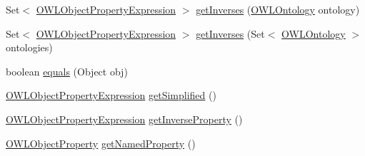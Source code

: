 \begin{DoxyCompactItemize}
Set$<$ \hyperlink{interfaceorg_1_1semanticweb_1_1owlapi_1_1model_1_1_o_w_l_object_property_expression}{O\-W\-L\-Object\-Property\-Expression} $>$ \hyperlink{classuk_1_1ac_1_1manchester_1_1cs_1_1owl_1_1owlapi_1_1_o_w_l_object_property_expression_impl_a078914721249eddee5fa7cf87da4c7b8}{get\-Inverses} (\hyperlink{interfaceorg_1_1semanticweb_1_1owlapi_1_1model_1_1_o_w_l_ontology}{O\-W\-L\-Ontology} ontology)
\item 
Set$<$ \hyperlink{interfaceorg_1_1semanticweb_1_1owlapi_1_1model_1_1_o_w_l_object_property_expression}{O\-W\-L\-Object\-Property\-Expression} $>$ \hyperlink{classuk_1_1ac_1_1manchester_1_1cs_1_1owl_1_1owlapi_1_1_o_w_l_object_property_expression_impl_a774d4ed2acd7eb6e2bfbf3a61ba978f7}{get\-Inverses} (Set$<$ \hyperlink{interfaceorg_1_1semanticweb_1_1owlapi_1_1model_1_1_o_w_l_ontology}{O\-W\-L\-Ontology} $>$ ontologies)
\item 
boolean \hyperlink{classuk_1_1ac_1_1manchester_1_1cs_1_1owl_1_1owlapi_1_1_o_w_l_object_property_expression_impl_a160ab1499c88adaa1d09d2dd30673d42}{equals} (Object obj)
\item 
\hyperlink{interfaceorg_1_1semanticweb_1_1owlapi_1_1model_1_1_o_w_l_object_property_expression}{O\-W\-L\-Object\-Property\-Expression} \hyperlink{classuk_1_1ac_1_1manchester_1_1cs_1_1owl_1_1owlapi_1_1_o_w_l_object_property_expression_impl_a7a40217b85225462f3032d4b0bf57d55}{get\-Simplified} ()
\item 
\hyperlink{interfaceorg_1_1semanticweb_1_1owlapi_1_1model_1_1_o_w_l_object_property_expression}{O\-W\-L\-Object\-Property\-Expression} \hyperlink{classuk_1_1ac_1_1manchester_1_1cs_1_1owl_1_1owlapi_1_1_o_w_l_object_property_expression_impl_a7ab684921e4afc56c4f3dc419bcb593a}{get\-Inverse\-Property} ()
\item 
\hyperlink{interfaceorg_1_1semanticweb_1_1owlapi_1_1model_1_1_o_w_l_object_property}{O\-W\-L\-Object\-Property} \hyperlink{classuk_1_1ac_1_1manchester_1_1cs_1_1owl_1_1owlapi_1_1_o_w_l_object_property_expression_impl_ac791acfd90e6c3b3fa0a300570ec52ff}{get\-Named\-Property} ()
\end{DoxyCompactItemize}
